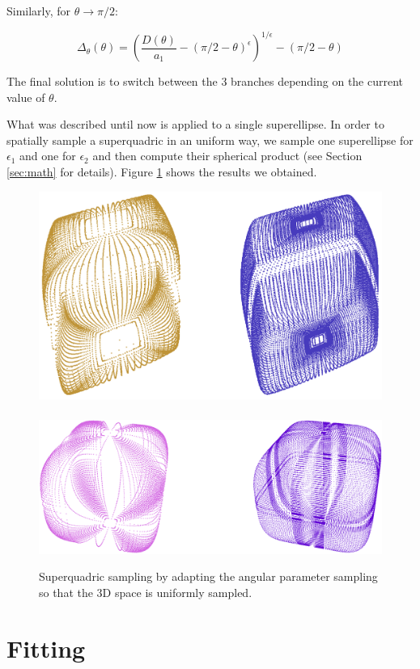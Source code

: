 \documentclass{article}
\begin{document}
Similarly, for $\theta \rightarrow \pi/2$:

\begin{equation}
\Delta_\theta (\theta) = \left( \frac{D(\theta)}{a_1} - (\pi/2 - \theta)^\epsilon \right)^{1/\epsilon} - (\pi/2 - \theta)
\end{equation}

The final solution is to switch between the 3 branches depending on the current value of $\theta$.

What was described until now is applied to a single superellipse. In order to spatially sample a superquadric in an uniform way, we sample one superellipse for $\epsilon_1$ and one for $\epsilon_2$ and then compute their spherical product (see Section \ref{sec:math} for details). Figure \ref{fig:sampling_smart} shows the results we obtained.

\begin{figure}
\centering
\includegraphics[width=0.75\columnwidth]{figures/sampling_smart_1}
\includegraphics[width=0.75\columnwidth]{figures/sampling_smart_2}
\caption {Superquadric sampling by adapting the angular parameter sampling so that the 3D space is uniformly sampled.}
\label{fig:sampling_smart}
\end{figure}



\section {Fitting}
\label{sec:fitting}
\end{document}
